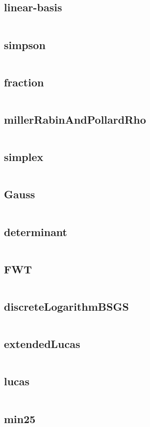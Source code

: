\subsection{linear-basis}
  \inputminted{cpp}{../code/math/linear-basis.cpp}
\subsection{simpson}
  \inputminted{cpp}{../code/math/simpson.cpp}
\subsection{fraction}
  \inputminted{cpp}{../code/math/fraction.cpp}
\subsection{millerRabinAndPollardRho}
  \inputminted{cpp}{../code/math/millerRabinAndPollardRho.cpp}
\subsection{simplex}
  \inputminted{cpp}{../code/math/simplex.cpp}
\subsection{Gauss}
  \inputminted{cpp}{../code/math/Gauss.cpp}
\subsection{determinant}
  \inputminted{cpp}{../code/math/determinant.cpp}
\subsection{FWT}
  \inputminted{cpp}{../code/math/FWT.cpp}
\subsection{discreteLogarithmBSGS}
  \inputminted{cpp}{../code/math/discreteLogarithmBSGS.cpp}
\subsection{extendedLucas}
  \inputminted{cpp}{../code/math/extendedLucas.cpp}
\subsection{lucas}
  \inputminted{cpp}{../code/math/lucas.cpp}
\subsection{min25}
  \inputminted{cpp}{../code/math/min25.cpp}
